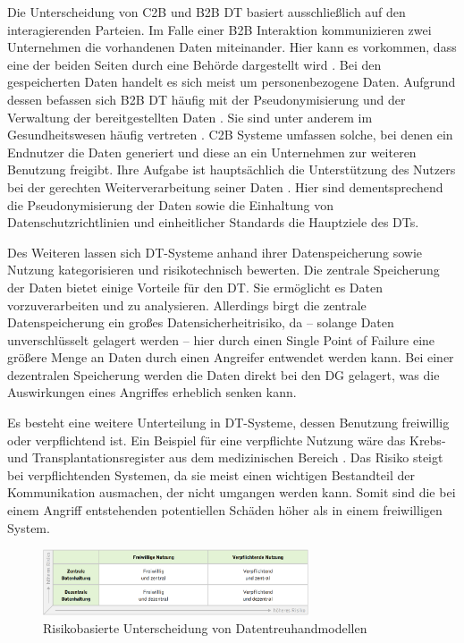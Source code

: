 \documentclass[
	fontsize=11pt,
	headings=small,
	parskip=half,           %
	bibliography=totoc,
	numbers=noenddot,       %
	open=any,               %
]{scrreprt}
\begin{document}
Die Unterscheidung von C2B und B2B DT basiert ausschließlich auf den interagierenden Parteien. Im Falle einer B2B Interaktion kommunizieren zwei Unternehmen die vorhandenen Daten miteinander. Hier kann es vorkommen, dass eine der beiden Seiten durch eine Behörde dargestellt wird \cite{dt-blankertz2020datentreuhandmodelle}. Bei den gespeicherten Daten handelt es sich meist um personenbezogene Daten. Aufgrund dessen befassen sich B2B DT häufig mit der Pseudonymisierung und der Verwaltung der bereitgestellten Daten . Sie sind unter anderem im Gesundheitswesen häufig vertreten \cite{dt-blankertz2020datentreuhandmodelle}.
C2B Systeme umfassen solche, bei denen ein Endnutzer die Daten generiert und diese an ein Unternehmen zur weiteren Benutzung freigibt. Ihre Aufgabe ist hauptsächlich die Unterstützung des Nutzers bei der gerechten Weiterverarbeitung seiner Daten \cite{dt-blankertz2020datentreuhandmodelle}. Hier sind dementsprechend die Pseudonymisierung der Daten sowie die Einhaltung von Datenschutzrichtlinien und einheitlicher Standards die Hauptziele des DTs.

Des Weiteren lassen sich DT-Systeme anhand ihrer Datenspeicherung sowie Nutzung kategorisieren und risikotechnisch bewerten. Die zentrale Speicherung der Daten bietet einige Vorteile für den DT. Sie ermöglicht es Daten vorzuverarbeiten und zu analysieren. Allerdings birgt die zentrale Datenspeicherung ein großes Datensicherheitrisiko, da -- solange Daten unverschlüsselt gelagert werden -- hier durch einen Single Point of Failure eine größere Menge an Daten durch einen Angreifer entwendet werden kann. Bei einer dezentralen Speicherung werden die Daten direkt bei den DG gelagert, was die Auswirkungen eines Angriffes erheblich senken kann. 

Es besteht eine weitere Unterteilung in DT-Systeme, dessen Benutzung freiwillig oder verpflichtend ist. Ein Beispiel für eine verpflichte Nutzung wäre das Krebs- und Transplantationsregister aus dem medizinischen Bereich \cite{dt-christmann2022krebsregister, dt-nageltransplatationsregister}. Das Risiko steigt bei verpflichtenden Systemen, da sie meist einen wichtigen Bestandteil der Kommunikation ausmachen, der nicht umgangen werden kann. Somit sind die bei einem Angriff entstehenden potentiellen Schäden höher als in einem freiwilligen System.

\begin{figure}
    \centering
    \includegraphics[width=0.7\textwidth]{DT-RisikoEinteilung.png}
    \caption{Risikobasierte Unterscheidung von Datentreuhandmodellen \cite{dt-blankertz2021neue}}
    \label{fig:dt-risikoeinteilug}
\end{figure}
\end{document}
